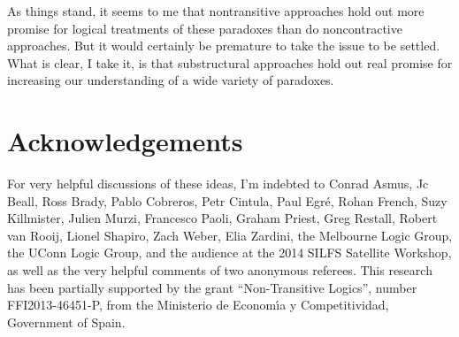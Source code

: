 \documentclass{ergoclass}
\begin{document}
As things stand, it seems to me that nontransitive approaches hold out more promise for logical treatments of these paradoxes than do noncontractive approaches. But it would certainly be premature to take the issue to be settled. What is clear, I take it, is that substructural approaches hold out real promise for increasing our understanding of a wide variety of paradoxes.

\section*{Acknowledgements}For very helpful discussions of these ideas, I'm indebted to Conrad Asmus, Jc Beall, Ross Brady, Pablo Cobreros, Petr Cintula, Paul Egr\'{e}, Rohan French, Suzy Killmister, Julien Murzi, Francesco Paoli, Graham Priest, Greg Restall, Robert van Rooij, Lionel Shapiro, Zach Weber, Elia Zardini, the Melbourne Logic Group, the UConn Logic Group, and the audience at the 2014 SILFS Satellite Workshop, as well as the very helpful comments of two anonymous referees. This research has been partially supported by the grant ``Non-Transitive Logics'', number FFI2013-46451-P, from the Ministerio de Econom\'{\i}a y Competitividad, Government of Spain.

%
\end{document}
